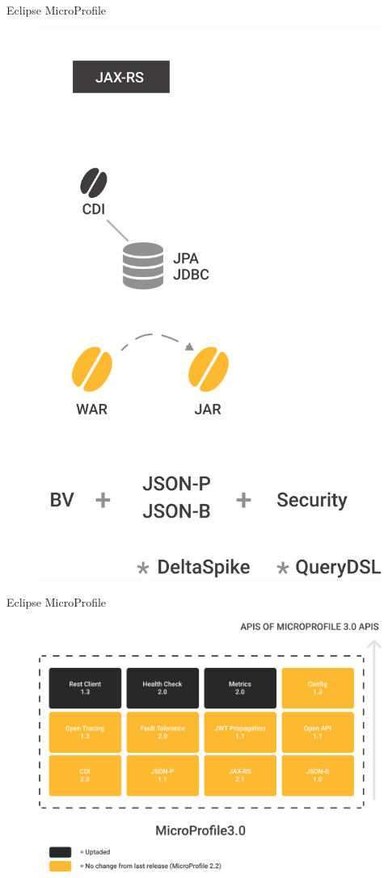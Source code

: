 \documentclass[aspectratio=169]{beamer}
\begin{document}
\begin{frame}{Eclipse MicroProfile}
\begin{figure}
	\centering
	\includegraphics[width=0.4\linewidth]{Images/newsetup}
\end{figure}
\end{frame}

\begin{frame}{Eclipse MicroProfile}
\begin{figure}
	\centering
	\includegraphics[width=0.65\linewidth]{Images/microprofileapis}
\end{figure}
\end{frame}

\end{document}
